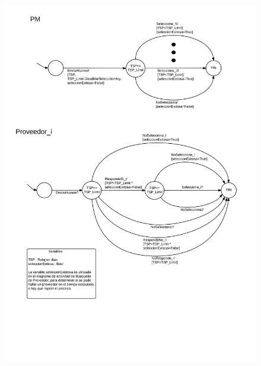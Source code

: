 \begin{figure}[H]
\includegraphics[width=\linewidth]{diag/nuevos/fsm-selprov.png}
\label{fsm-selprov}
\end{figure}

